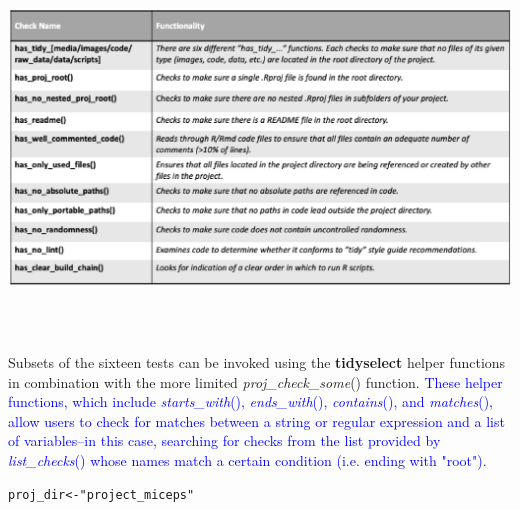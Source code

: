 \documentclass[APA,LATO1COL]{WileyNJD-v2}\usepackage[]{graphicx}\usepackage[]{color}
\makeatletter
\newcommand{\hlstr}[1]{\textcolor[rgb]{0.192,0.494,0.8}{#1}}%
\newcommand{\hlstd}[1]{\textcolor[rgb]{0.345,0.345,0.345}{#1}}%
\newcommand{\hlkwb}[1]{\textcolor[rgb]{0.69,0.353,0.396}{#1}}%
\newenvironment{kframe}{%
 \def\at@end@of@kframe{}%
 \ifinner\ifhmode%
  \def\at@end@of@kframe{\end{minipage}}%
  \begin{minipage}{\columnwidth}%
 \fi\fi%
 \def\FrameCommand##1{\hskip\@totalleftmargin \hskip-\fboxsep
 \colorbox{shadecolor}{##1}\hskip-\fboxsep
     \hskip-\linewidth \hskip-\@totalleftmargin \hskip\columnwidth}%
 \MakeFramed {\advance\hsize-\width
   \@totalleftmargin\z@ \linewidth\hsize
   \@setminipage}}%
 {\par\unskip\endMakeFramed%
 \at@end@of@kframe}
\newenvironment{knitrout}{}{} %
\newcommand{\pkg}[1]{\textbf{#1}}
\newcommand{\func}[1]{\textit{#1}()}
\makeatother
\begin{document}
\includegraphics[width=500pt,height=280pt]{list-checks}

Subsets of the sixteen tests can be invoked using the \pkg{tidyselect} helper functions \citep{R-tidyselect} in combination with the more limited \func{proj\_check\_some} function. \textcolor{blue}{These helper functions, which include \func{starts\_with}, \func{ends\_with}, \func{contains}, and \func{matches}, allow users to check for matches between a string or regular expression and a list of variables--in this case, searching for checks from the list provided by \func{list\_checks} whose names match a certain condition (i.e. ending with "root")}.

\begin{knitrout}
\color{fgcolor}\begin{kframe}
\begin{alltt}
\hlstd{proj_dir} \hlkwb{<-} \hlstr{"project_miceps"}
\end{alltt}
\end{kframe}
\end{knitrout}
\end{document}
